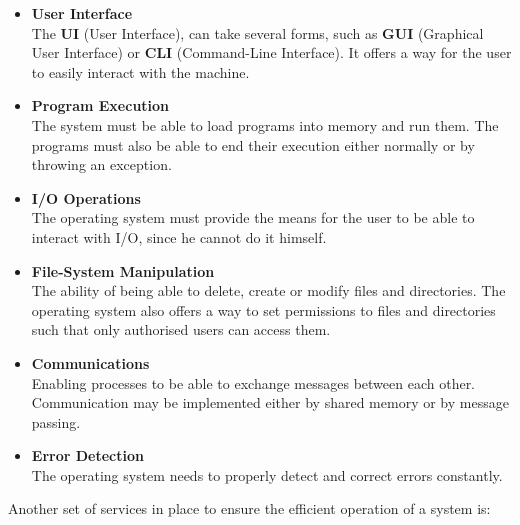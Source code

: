 \documentclass{article}
\begin{document}
\begin{itemize}
	\item \textbf{User Interface}
	\vspace{.2cm} \\
	The \textbf{UI} (User Interface), can take several forms, such as \textbf{GUI} (Graphical User Interface) or \textbf{CLI} (Command-Line Interface). It offers a way for the user to easily interact with the machine.
	
	\item \textbf{Program Execution}
	\vspace{.2cm} \\
	The system must be able to load programs into memory and run them. The programs must also be able to end their execution either normally or by throwing an exception.
	
	\item \textbf{I/O Operations}
	\vspace{.2cm} \\
	The operating system must provide the means for the user to be able to interact with I/O, since he cannot do it himself.
	
	\item \textbf{File-System Manipulation}
	\vspace{.2cm} \\
	The ability of being able to delete, create or modify files and directories. The operating system also offers a way to set permissions to files and directories such that only authorised users can access them.
	
	\item \textbf{Communications}
	\vspace{.2cm} \\
	Enabling processes to be able to exchange messages between each other. Communication may be implemented either by shared memory or by message passing.
	
	\item \textbf{Error Detection}
	\vspace{.2cm} \\
	The operating system needs to properly detect and correct errors constantly.
\end{itemize}
Another set of services in place to ensure the efficient operation of a system is:
\end{document}
